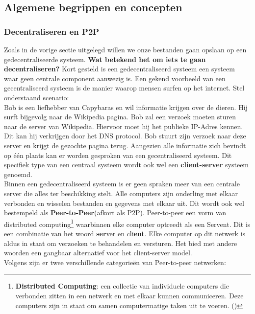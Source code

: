 \subsection{Algemene begrippen en concepten}
\label{ipfs_decent}

\subsubsection{Decentraliseren en P2P}
Zoals in de vorige sectie uitgelegd willen we onze bestanden gaan opslaan op een gedecentraliseerde systeem. \textbf{Wat betekend het om iets te gaan decentraliseren?} Kort gesteld is een gedecentraliseerd systeem een systeem waar geen centrale component aanwezig is. Een gekend voorbeeld van een gecentraliseerd systeem is de manier waarop mensen surfen op het internet. Stel onderstaand scenario:\\

Bob is een liefhebber van Capybaras en wil informatie krijgen over de dieren. Hij surft bijgevolg naar de Wikipedia pagina. Bob zal een verzoek moeten sturen naar de server van Wikipedia. Hiervoor moet hij het publieke IP-Adres kennen. Dit kan hij verkrijgen door het DNS protocol. Bob stuurt zijn verzoek naar deze server en krijgt de gezochte pagina terug. Aangezien alle informatie zich bevindt op één plaats kan er worden gesproken van een gecentraliseerd systeem. Dit specifiek type van een centraal systeem wordt ook wel een \textbf{client-server} systeem genoemd.\\

Binnen een gedecentraliseerd systeem is er geen spraken meer van een centrale server die alles ter beschikking stelt. Alle computers zijn onderling met elkaar verbonden en wisselen bestanden en gegevens met elkaar uit. Dit wordt ook wel bestempeld als \textbf{Peer-to-Peer}(afkort als P2P). Peer-to-peer een vorm van distributed computing\footnote{\textbf{Distributed Computing}: een collectie van individuele computers die verbonden zitten in een netwerk en met elkaar kunnen communiceren. Deze computers zijn in staat om samen computermatige taken uit te voeren. (\autocite{Attiya2004})} waarbinnen elke computer optreedt als een Servent. Dit is een combinatie van het woord \textbf{ser}ver en cli\textbf{ent}. Elke computer op dit netwerk is aldus in staat om verzoeken te behandelen en versturen. Het bied met andere woorden een gangbaar alternatief voor het client-server model. \\
 
Volgens \textcite{Schollmeier2001} zijn er  twee verschillende categorieën van Peer-to-peer netwerken:

